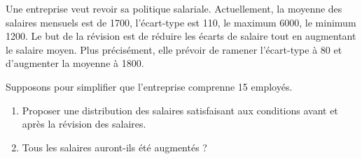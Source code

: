 
\begin{exercice}\label{exosmath-0248}

Une entreprise veut revoir sa politique salariale. Actuellement, la moyenne des salaires mensuels est de 1700, l'écart-type est 110, le maximum 6000, le minimum 1200.  
Le but de la révision est de réduire les écarts de salaire tout en augmentant le salaire moyen. Plus précisément, elle prévoir de ramener l'écart-type à 80 et d'augmenter la moyenne à 1800. 

Supposons pour simplifier que l'entreprise comprenne 15 employés.

\begin{enumerate}
    \item
        Proposer une distribution des salaires satisfaisant aux conditions avant et après la révision des salaires.
    \item
        Tous les salaires auront-ils été augmentés ?
\end{enumerate}


\end{exercice}
